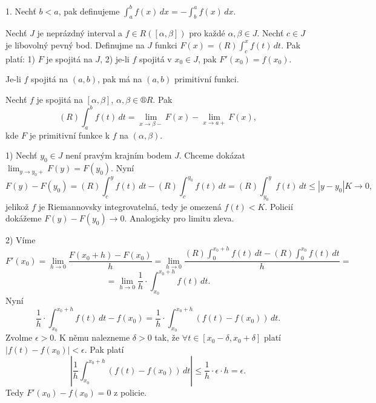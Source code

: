\documentclass[12pt]{article}                   %
\begin{document}
        \begin{poznamka}[Úmluva]
            1. Nechť $b < a$, pak definujeme $\int_a^b f(x)\,dx = - \int_b^a f(x)\,dx$.
        \end{poznamka}

        \begin{veta}
            Nechť $J$ je neprázdný interval a $f \in R([\alpha, \beta])$ pro každé $\alpha, \beta \in J$. Nechť $c \in J$ je libovolný pevný bod. Definujme na $J$ funkci $F(x) = (R) \int_c^x f(t)\,dt$. Pak platí: 1) $F$ je spojitá na $J$, 2) je-li $f$ spojitá v $x_0 \in J$, pak $F'(x_0) = f(x_0)$.
        \end{veta}

        \begin{dusledek}
            Je-li $f$ spojitá na $(a, b)$, pak má na $(a, b)$ primitivní funkci.
        \end{dusledek}

        \begin{dusledek}
            Nechť $f$ je spojitá na $[\alpha, \beta]$, $\alpha, \beta \in ®R$. Pak
            $$ (R) \int_a^b f(t)\,dt = \lim_{x \rightarrow \beta-} F(x) - \lim_{x \rightarrow a+} F(x), $$ 
            kde $F$ je primitivní funkce k $f$ na $(\alpha, \beta)$.
        \end{dusledek}


        \begin{dukaz}
            1) Nechť $y_0 \in J$ není pravým krajním bodem $J$. Chceme dokázat $\lim_{y \rightarrow y_0+} F(y) = F(y_0)$. Nyní
            $$ F(y) - F(y_0) = (R) \int_c^y f(t)\,dt - (R)\int_c^{y_0} f(t)\,dt = (R)\int_{y_0}^y f(t)\,dt ≤ |y - y_0|K \rightarrow 0, $$
            jelikož $f$ je Riemannovsky integrovatelná, tedy je omezená $f(t) < K$. Policií dokážeme $F(y) - F(y_0) \rightarrow 0$. Analogicky pro limitu zleva.

            2) Víme 
            $$ F'(x_0) = \lim_{h \rightarrow 0} \frac{F(x_0 + h) - F(x_0)}{h} = \lim_{h \rightarrow 0} \frac{(R) \int_0^{x_0 + h} f(t)\,dt - (R)\int_0^{x_0} f(t)\,dt}{h} = $$
            $$ = \lim_{h \rightarrow 0} \frac{1}{h}·\int_{x_0}^{x_0 + h} f(t)\,dt. $$
            Nyní
            $$ \frac{1}{h}·\int_{x_0}^{x_0 + h} f(t)\,dt - f(x_0) = \frac{1}{h}·\int_{x_0}^{x_0 + h} (f(t) - f(x_0))\,dt. $$ 
            Zvolme $\epsilon > 0$. K němu nalezneme $\delta > 0$ tak, že $\forall t \in [x_0 - \delta, x_0 + \delta]$ platí $|f(t) - f(x_0)| < \epsilon$. Pak platí
            $$ \left|\frac{1}{h}\int_{x_0}^{x_0 + h} (f(t) - f(x_0))\,dt\right| ≤ \frac{1}{h}·\epsilon·h = \epsilon. $$
            Tedy $F'(x_0) - f(x_0) = 0$ z policie.
        \end{dukaz}
\end{document}
